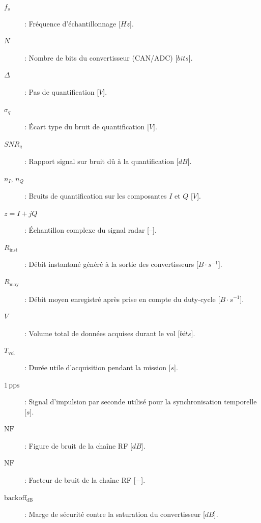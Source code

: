\begin{description}
    \item[$f_s$] : Fréquence d’échantillonnage [$Hz$].
    \item[$N$] : Nombre de bits du convertisseur (CAN/ADC) [$bits$].
    \item[$\Delta$] : Pas de quantification [$V$].
    \item[$\sigma_q$] : Écart type du bruit de quantification [$V$].
    \item[$SNR_q$] : Rapport signal sur bruit dû à la quantification [$dB$].
    \item[$n_I,\,n_Q$] : Bruits de quantification sur les composantes $I$ et $Q$ [$V$].
    \item[$z = I + jQ$] : Échantillon complexe du signal radar [$–$].

    \item[$R_{\mathrm{inst}}$] : Débit instantané généré à la sortie des convertisseurs [$B·s^{-1}$].
    \item[$R_{\mathrm{moy}}$] : Débit moyen enregistré après prise en compte du duty-cycle [$B·s^{-1}$].
    \item[$V$] : Volume total de données acquises durant le vol [$bits$].
    \item[$T_{\mathrm{vol}}$] : Durée utile d’acquisition pendant la mission [$s$].

    \item[$1\,\mathrm{pps}$] : Signal d’impulsion par seconde utilisé pour la synchronisation temporelle [$s$].
    \item[$\mathrm{NF}$] : Figure de bruit de la chaîne RF [$dB$].
    \item[$\mathrm{NF}$] : Facteur de bruit de la chaîne RF [$-$].
    \item[$\mathrm{backoff_{dB}}$] : Marge de sécurité contre la saturation du convertisseur [$dB$].
\end{description}







